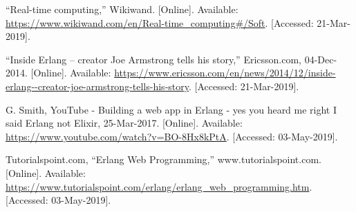 \documentclass[11 pt]{IEEEtran}
\begin{document}
\begin{thebibliography}{99}
“Real-time computing,” Wikiwand. [Online]. Available: \url{https://www.wikiwand.com/en/Real-time_computing#/Soft}. [Accessed: 21-Mar-2019].

“Inside Erlang – creator Joe Armstrong tells his story,” Ericsson.com, 04-Dec-2014. [Online]. Available: \url{https://www.ericsson.com/en/news/2014/12/inside-erlang--creator-joe-armstrong-tells-his-story}. [Accessed: 21-Mar-2019].

G. Smith, YouTube - Building a web app in Erlang - yes you heard me right I said Erlang not Elixir, 25-Mar-2017. [Online]. Available: \url{https://www.youtube.com/watch?v=BO-8Hx8kPtA}. [Accessed: 03-May-2019].

Tutorialspoint.com, ``Erlang Web Programming,'' www.tutorialspoint.com. [Online]. Available: \url{https://www.tutorialspoint.com/erlang/erlang_web_programming.htm}. [Accessed: 03-May-2019].

\end{thebibliography}
\end{document}
